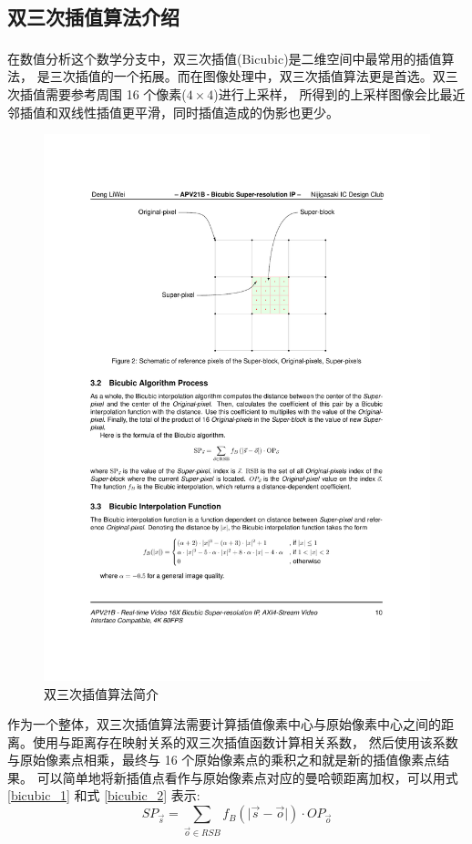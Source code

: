 \documentclass[12pt, a4paper, oneside]{ctexbook}
\begin{document}
	\subsection{双三次插值算法介绍}
	在数值分析这个数学分支中，双三次插值(Bicubic)\textsuperscript{\cite{10}\cite{11}}是二维空间中最常用的插值算法，
	是三次插值的一个拓展。而在图像处理中，双三次插值算法更是首选。双三次插值需要参考周围 16 个像素($4 \times 4$)进行上采样，
	所得到的上采样图像会比最近邻插值和双线性插值更平滑，同时插值造成的伪影也更少。
	\begin{figure}[h]
		\centering
		\includegraphics[scale=1]{./pic/bicubic-introduction.pdf}
		\caption{双三次插值算法简介}
		\label{bicubic_introduction}
	\end{figure}
	\par
	作为一个整体，双三次插值算法需要计算插值像素中心与原始像素中心之间的距离。使用与距离存在映射关系的双三次插值函数计算相关系数，
	然后使用该系数与原始像素点相乘，最终与 16 个原始像素点的乘积之和就是新的插值像素点结果。
	可以简单地将新插值点看作与原始像素点对应的曼哈顿距离加权，可以用式 \ref{bicubic_1} 和式 \ref{bicubic_2} 表示:
	\begin{equation}
		SP_{\vec{s}}=\sum_{\vec{o}\in{RSB}}f_B(\vert\vec{s}-\vec{o}\vert)\cdot OP_{\vec{o}}		
		\label{bicubic_1}
	\end{equation}	
	
\end{document}
